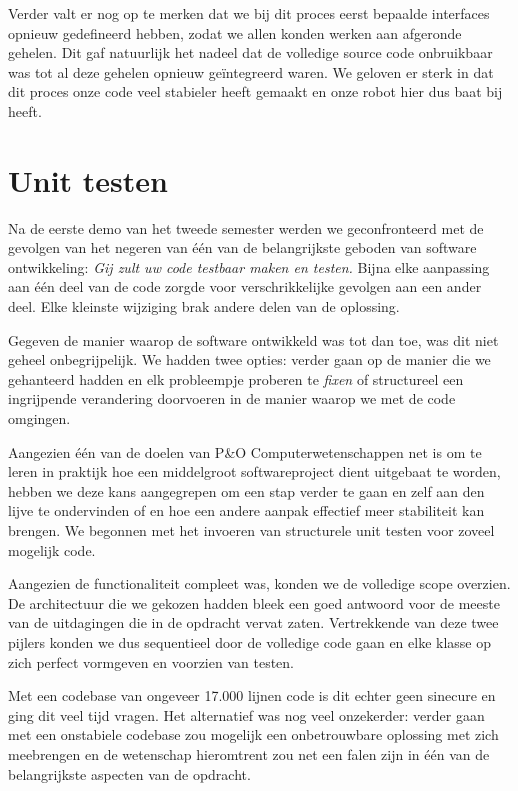\documentclass[12pt,a4paper]{report}
\begin{document}
Verder valt er nog op te merken dat we bij dit proces eerst bepaalde interfaces opnieuw gedefineerd hebben, zodat we allen konden werken aan afgeronde gehelen. Dit gaf natuurlijk het nadeel dat de volledige source code onbruikbaar was tot al deze gehelen opnieuw ge\"integreerd waren. We geloven er sterk in dat dit proces onze code veel stabieler heeft gemaakt en onze robot hier dus baat bij heeft.

\section{Unit testen}
\label{unittesten}

Na de eerste demo van het tweede semester werden we geconfronteerd met de gevolgen van het negeren van \'e\'en van de belangrijkste geboden van software ontwikkeling: \emph{Gij zult uw code testbaar maken en testen.} Bijna elke aanpassing aan \'e\'en deel van de code zorgde voor verschrikkelijke gevolgen aan een ander deel. Elke kleinste wijziging brak andere delen van de oplossing.

Gegeven de manier waarop de software ontwikkeld was tot dan toe, was dit niet geheel onbegrijpelijk. We hadden twee opties: verder gaan op de manier die we gehanteerd hadden en elk probleempje proberen te \emph{fixen} of structureel een ingrijpende verandering doorvoeren in de manier waarop we met de code omgingen.

Aangezien \'e\'en van de doelen van P\&O Computerwetenschappen net is om te leren in praktijk hoe een middelgroot softwareproject dient uitgebaat te worden, hebben we deze kans aangegrepen om een stap verder te gaan en zelf aan den lijve te ondervinden of en hoe een andere aanpak effectief meer stabiliteit kan brengen. We begonnen met het invoeren van structurele unit testen voor zoveel mogelijk code.

Aangezien de functionaliteit compleet was, konden we de volledige scope overzien. De architectuur die we gekozen hadden bleek een goed antwoord voor de meeste van de uitdagingen die in de opdracht vervat zaten. Vertrekkende van deze twee pijlers konden we dus sequentieel door de volledige code gaan en elke klasse op zich perfect vormgeven en voorzien van testen.

Met een codebase van ongeveer 17.000 lijnen code is dit echter geen sinecure en ging dit veel tijd vragen. Het alternatief was nog veel onzekerder: verder gaan met een onstabiele codebase zou mogelijk een onbetrouwbare oplossing met zich meebrengen en de wetenschap hieromtrent zou net een falen zijn in \'e\'en van de belangrijkste aspecten van de opdracht.
\end{document}
